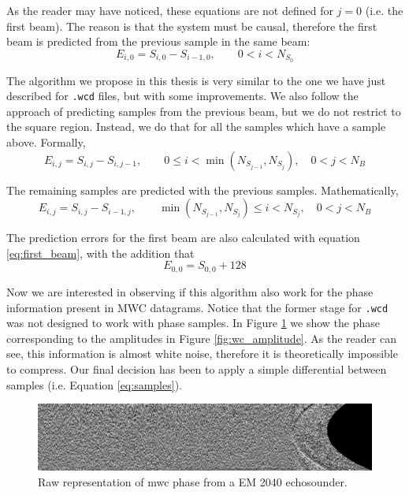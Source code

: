 As the reader may have noticed, these equations are not defined for $j=0$ (i.e. the first beam). The reason is that the system must be causal, therefore the first beam is predicted from the previous sample in the same beam:
\begin{equation} \label{eq:first_beam}
E_{i,0} = S_{i,0} - S_{i-1,0}, \qquad 0 < i < N_{S_0}
\end{equation}

The algorithm we propose in this thesis is very similar to the one we have just described for \texttt{.wcd} files, but with some improvements. We also follow the approach of predicting samples from the previous beam, but we do not restrict to the square region. Instead, we do that for all the samples which have a sample above. Formally,
\begin{equation}
E_{i,j} = S_{i,j} - S_{i,j-1}, \qquad 0 \leq i < \min(N_{S_{j-1}}, N_{S_j}), \quad 0 < j < N_B
\end{equation}

The remaining samples are predicted with the previous samples. Mathematically,
\begin{equation} \label{eq:samples}
E_{i,j} = S_{i,j} - S_{i-1,j}, \qquad \min(N_{S_{j-1}}, N_{S_j}) \leq i < N_{S_j}, \quad 0 < j < N_B
\end{equation}

The prediction errors for the first beam are also calculated with equation \ref{eq:first_beam}, with the addition that
\begin{equation}
E_{0,0} = S_{0,0} + 128
\end{equation}

Now we are interested in observing if this algorithm also work for the phase information present in MWC datagrams. Notice that the former stage for \texttt{.wcd} was not designed to work with phase samples. In Figure \ref{fig:wc_phase} we show the phase corresponding to the amplitudes in Figure \ref{fig:wc_amplitude}. As the reader can see, this information is almost white noise, therefore it is theoretically impossible to compress. Our final decision has been to apply a simple differential between samples (i.e. Equation \ref{eq:samples}).
\begin{figure}[h!]
	\begin{center}
		\includegraphics[scale=0.334]{images/water_column_ph.png}
	\end{center}
	\caption{Raw representation of \acrshort{mwc} phase from a EM 2040 echosounder.}
	\label{fig:wc_phase}
\end{figure}


